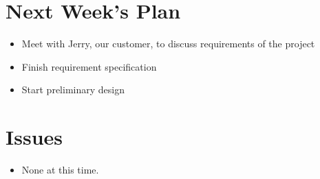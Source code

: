 %
%
%
\section{Next Week's Plan}
\begin{itemize}
\item Meet with Jerry, our customer, to discuss requirements of the project
\item Finish requirement specification
\item Start preliminary design
\end{itemize}

%
%
%
\section{Issues}
\begin{itemize}
\item None at this time.
\end{itemize}


